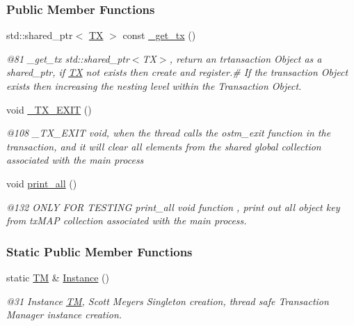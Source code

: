 \subsubsection*{Public Member Functions}
\begin{DoxyCompactItemize}
\item 
std\+::shared\+\_\+ptr$<$ \hyperlink{class_t_x}{TX} $>$ const \hyperlink{class_t_m_a41cb0226cc4080c931651b13f74a0075_a41cb0226cc4080c931651b13f74a0075}{\+\_\+get\+\_\+tx} ()
\begin{DoxyCompactList}\small\item\em @81 \+\_\+get\+\_\+tx std\+::shared\+\_\+ptr$<$\+T\+X$>$, return an trtansaction Object as a shared\+\_\+ptr, if \hyperlink{class_t_x}{TX} not exists then create and register.\# If the transaction Object exists then increasing the nesting level within the Transaction Object. \end{DoxyCompactList}\item 
void \hyperlink{class_t_m_a5e2d1127f2429f2f524d25f430eade06_a5e2d1127f2429f2f524d25f430eade06}{\+\_\+\+T\+X\+\_\+\+E\+X\+IT} ()
\begin{DoxyCompactList}\small\item\em @108 \+\_\+\+T\+X\+\_\+\+E\+X\+IT void, when the thread calls the ostm\+\_\+exit function in the transaction, and it will clear all elements from the shared global collection associated with the main process \end{DoxyCompactList}\item 
void \hyperlink{class_t_m_a1d6891b1d3e71cc0acef54e7afe71c09_a1d6891b1d3e71cc0acef54e7afe71c09}{print\+\_\+all} ()
\begin{DoxyCompactList}\small\item\em @132 O\+N\+LY F\+OR T\+E\+S\+T\+I\+NG print\+\_\+all void function , print out all object key from tx\+M\+AP collection associated with the main process. \end{DoxyCompactList}\end{DoxyCompactItemize}
\subsubsection*{Static Public Member Functions}
\begin{DoxyCompactItemize}
\item 
static \hyperlink{class_t_m}{TM} \& \hyperlink{class_t_m_a7ce5f35e0dae76df4fe116cf905bbe60_a7ce5f35e0dae76df4fe116cf905bbe60}{Instance} ()
\begin{DoxyCompactList}\small\item\em @31 Instance \hyperlink{class_t_m}{TM}, Scott Meyer\textquotesingle{}s Singleton creation, thread safe Transaction Manager instance creation. \end{DoxyCompactList}\end{DoxyCompactItemize}
